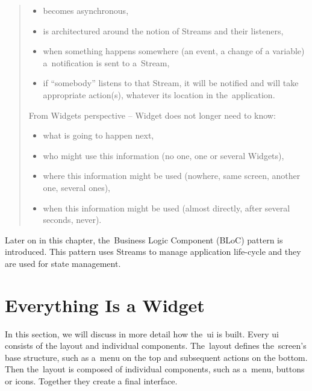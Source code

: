 \begin{quote}
    \begin{itemize}
        \item becomes asynchronous,
        \item is architectured around the notion of Streams and their listeners,
        \item when something happens somewhere (an event, a change of a variable) a~notification is sent to a~Stream,
        \item if ``somebody'' listens to that Stream, it will be notified and will take appropriate action(s), whatever its location in the~application.
    \end{itemize}
    
    From Widgets perspective -- Widget does not longer need to know:
    
    \begin{itemize}
        \item what is going to happen next,
        \item who might use this information (no one, one or several Widgets),
        \item where this information might be used (nowhere, same screen, another one, several ones),
        \item when this information might be used (almost directly, after several seconds, never).
    \end{itemize}
\end{quote}

Later on in this chapter, the~Business Logic Component (BLoC) pattern is introduced. This pattern uses Streams to manage application life-cycle and they are used for state management.
\section{Everything Is a Widget}
In this section, we will discuss in more detail how the~\gls{ui} is built. Every \gls{ui} consists of the layout and individual components. The~layout defines the~screen's base structure, such as a~menu on the top and subsequent actions on the bottom. Then the~layout is composed of individual components, such as a~menu, buttons or icons. Together they create a final interface.


